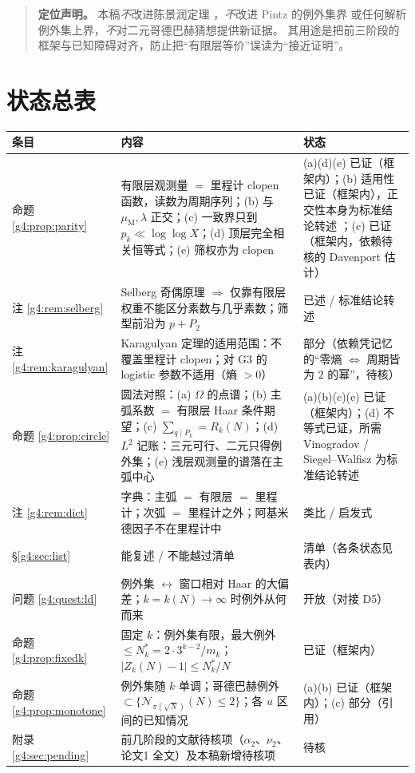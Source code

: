 \documentclass[11pt,a4paper]{article}
\newcommand{\Cnt}{\mathcal N}          %
\newcommand{\Om}{\Omega}               %
\newcommand{\Mob}{\mu_{\mathrm{M}}}    %
\newcommand{\Liou}{\lambda}            %
\theoremstyle{plain}
\theoremstyle{definition}
\begin{document}
\begin{CJK}{UTF8}{gbsn}
\begin{abstract}
\textbf{定位声明。} 本稿\emph{不}改进陈景润定理 \cite{Chen73}，\emph{不}改进 Pintz 的例外集界 \cite{Pin18} 或任何解析例外集上界，\emph{不}对二元哥德巴赫猜想提供新证据。
其用途是把前三阶段的框架与已知障碍对齐，防止把“有限层等价”误读为“接近证明”。
\end{abstract}

\section*{状态总表}
\begin{center}
\begin{tabular}{p{2.6cm}p{7.6cm}p{4.2cm}}
\hline
条目 & 内容 & 状态\\
\hline
命题 \ref{g4:prop:parity} & 有限层观测量 $=$ 里程计 clopen 函数，读数为周期序列；(b) 与 $\Mob,\Liou$ 正交；(c) 一致界只到 $p_k\ll\log\log X$；(d) 顶层完全相关恒等式；(e) 筛权亦为 clopen & (a)(d)(e) 已证（框架内）；(b) 适用性已证（框架内），正交性本身为标准结论转述 \cite{DK15,Sar10}；(c) 已证（框架内，依赖待核的 Davenport 估计）\\
注 \ref{g4:rem:selberg} & Selberg 奇偶原理 $\Rightarrow$ 仅靠有限层权重不能区分素数与几乎素数；筛型前沿为 $p+P_2$ & 已述 / 标准结论转述\\
注 \ref{g4:rem:karagulyan} & Karagulyan 定理的适用范围：不覆盖里程计 clopen；对 G3 的 logistic 参数不适用（熵 $>0$） & 部分（依赖凭记忆的“零熵 $\iff$ 周期皆为 $2$ 的幂”，待核）\\
命题 \ref{g4:prop:circle} & 圆法对照：(a) $\Om$ 的点谱；(b) 主弧系数 $=$ 有限层 Haar 条件期望；(c) $\sum_{q\mid P_k}=R_k(N)$；(d) $L^2$ 记账：三元可行、二元只得例外集；(e) 浅层观测量的谱落在主弧中心 & (a)(b)(c)(e) 已证（框架内）；(d) 不等式已证，所需 Vinogradov / Siegel--Walfisz 为标准结论转述\\
注 \ref{g4:rem:dict} & 字典：主弧 $=$ 有限层 $=$ 里程计；次弧 $=$ 里程计之外；阿基米德因子不在里程计中 & 类比 / 启发式\\
\S\ref{g4:sec:list} & 能复述 / 不能越过清单 & 清单（各条状态见表内）\\
问题 \ref{g4:quest:ld} & 例外集 $\leftrightarrow$ 窗口相对 Haar 的大偏差；$k=k(N)\to\infty$ 时例外从何而来 & 开放（对接 D5）\\
命题 \ref{g4:prop:fixedk} & 固定 $k$：例外集有限，最大例外 $\le N_k^*=2\cdot3^{k-2}/m_k$；$|Z_k(N)-1|\le N_k^*/N$ & 已证（框架内）\\
命题 \ref{g4:prop:monotone} & 例外集随 $k$ 单调；哥德巴赫例外 $\subset\{\Cnt_{\pi(\sqrt N)}(N)\le2\}$；各 $u$ 区间的已知情况 & (a)(b) 已证（框架内）；(c) 部分（引用）\\
附录 \ref{g4:sec:pending} & 前几阶段的文献待核项（$\alpha_2$、$\nu_2$、论文1 全文）及本稿新增待核项 & 待核\\
\hline
\end{tabular}
\end{center}


\end{CJK}
\end{document}
